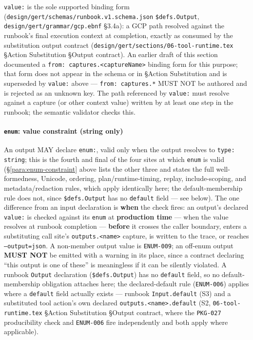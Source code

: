 \texttt{value:} is the sole supported binding form (\texttt{design/gert/schemas/runbook.v1.schema.json}
\texttt{\$defs.Output}, \texttt{design/gert/grammar/gcp.ebnf} \S3.4a): a GCP
path resolved against the runbook's final execution context at completion,
exactly as consumed by the substitution output contract
(\texttt{design/gert/sections/06-tool-runtime.tex} \S Action Substitution
\S Output contract). An earlier draft of this section documented a
\texttt{from: captures.<captureName>} binding form for this purpose; that
form does not appear in the schema or in \S Action Substitution and is
superseded by \texttt{value:} above --- \texttt{from: captures.*} MUST NOT be
authored and is rejected as an unknown key. The path referenced by
\texttt{value:} must resolve against a capture (or other context value)
written by at least one step in the runbook; the semantic validator checks
this.

\paragraph{\texttt{enum}: value constraint (string only)}

An output MAY declare \texttt{enum:}, valid only when the output resolves to
\texttt{type: string}; this is the fourth and final of the four sites at
which \texttt{enum} is valid (\S\ref{para:enum-constraint} above lists the
other three and states the full well-formedness, Unicode, ordering,
plan/runtime-timing, replay, include-scoping, and metadata/redaction rules,
which apply identically here; the default-membership rule does not, since
\texttt{\$defs.Output} has no \texttt{default} field --- see below). The one
difference from an input declaration is \textbf{when} the check fires: an
output's declared \texttt{value:} is
checked against its \texttt{enum} at \textbf{production time} --- when the
value resolves at runbook completion --- \textbf{before} it crosses the
caller boundary, enters a substituting call site's \texttt{outputs.<name>}
capture, is written to the trace, or reaches \texttt{--output=json}. A
non-member output value is \texttt{ENUM-009}; an off-enum output
\textbf{MUST NOT} be emitted with a warning in its place, since a contract
declaring ``this output is one of these'' is meaningless if it can be
silently violated. A runbook \texttt{Output} declaration
(\texttt{\$defs.Output}) has no \texttt{default} field, so no
default-membership obligation attaches here; the declared-default rule
(\texttt{ENUM-006}) applies where a \texttt{default} field actually exists
--- runbook \texttt{Input.default} (S3) and a substituted tool action's own
declared \texttt{outputs.<name>.default} (S2, \texttt{06-tool-runtime.tex}
\S Action Substitution \S Output contract, where the \texttt{PKG-027}
producibility check and \texttt{ENUM-006} fire independently and both apply
where applicable).

